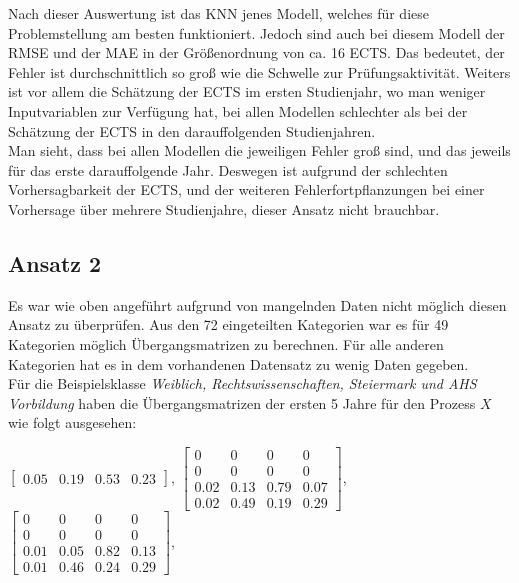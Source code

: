 \noindent Nach dieser Auswertung ist das KNN jenes Modell, welches f\"ur diese Problemstellung am besten funktioniert. Jedoch sind auch bei diesem Modell der
RMSE und der MAE in der Gr\"o{\ss}enordnung von ca. 16 ECTS. Das bedeutet, der Fehler ist durchschnittlich so gro{\ss} wie die Schwelle zur Pr\"ufungsaktivit\"at.
Weiters ist vor allem die Sch\"atzung der ECTS im ersten Studienjahr, wo man weniger Inputvariablen zur Verf\"ugung hat, bei allen Modellen schlechter als bei der
Sch\"atzung der ECTS in den darauffolgenden Studienjahren. \\

\noindent Man sieht, dass bei allen Modellen die jeweiligen Fehler gro{\ss} sind, und das jeweils f\"ur das erste darauffolgende Jahr.
Deswegen ist aufgrund der schlechten Vorhersagbarkeit der ECTS, und der weiteren Fehlerfortpflanzungen bei einer Vorhersage \"uber mehrere Studienjahre,
dieser Ansatz nicht brauchbar. \\










\subsection{Ansatz 2}
Es war wie oben angef\"uhrt aufgrund von mangelnden Daten nicht m\"oglich diesen Ansatz zu \"uberpr\"ufen.
Aus den 72 eingeteilten Kategorien war es f\"ur 49 Kategorien m\"oglich \"Ubergangsmatrizen zu berechnen. F\"ur alle anderen
Kategorien hat es in dem vorhandenen Datensatz zu wenig Daten gegeben. \\

F\"ur die Beispielsklasse \textit{Weiblich, Rechtswissenschaften, Steiermark und AHS Vorbildung} haben die \"Ubergangsmatrizen der ersten 5 Jahre f\"ur den Prozess $X$ wie folgt ausgesehen:

$\left[ \begin{array}{rrrr}  0.05 & 0.19 & 0.53 & 0.23  \end{array}\right]$, $\left[ \begin{array}{rrrr} 0 & 0 & 0 & 0 \\  0 & 0 & 0 & 0 \\ 0.02 & 0.13 & 0.79 & 0.07 \\ 0.02 & 0.49 & 0.19 & 0.29 \end{array}\right]$,
$\left[ \begin{array}{rrrr} 0 & 0 & 0 & 0 \\  0 & 0 & 0 & 0 \\ 0.01 & 0.05  & 0.82  & 0.13 \\ 0.01 & 0.46 & 0.24 & 0.29 \end{array}\right]$, \\

